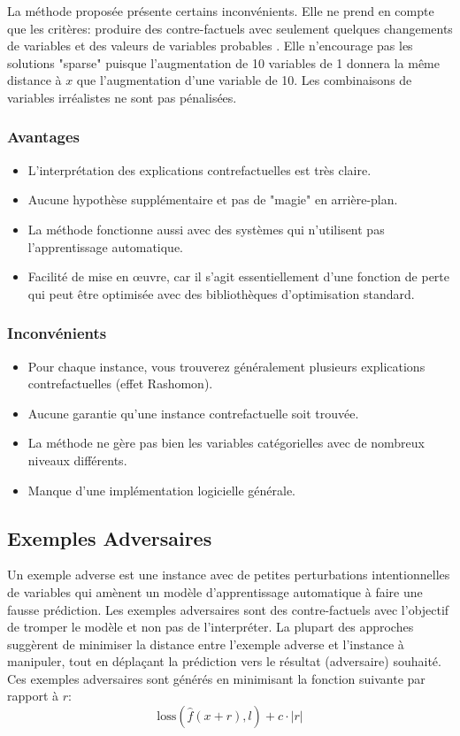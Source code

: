 La méthode proposée présente certains inconvénients. Elle ne prend en compte que les critères: produire des contre-factuels avec seulement quelques changements de variables et des valeurs de variables probables . Elle n'encourage pas les solutions "sparse" puisque l'augmentation de 10 variables de 1 donnera la même distance à \(x\) que l'augmentation d'une variable de 10. Les combinaisons de variables irréalistes ne sont pas pénalisées.


\subsubsection{Avantages}
\begin{itemize}
    \item L'interprétation des explications contrefactuelles est très claire.
    \item Aucune hypothèse supplémentaire et pas de "magie" en arrière-plan.
    \item La méthode fonctionne aussi avec des systèmes qui n'utilisent pas l'apprentissage automatique.
    \item Facilité de mise en œuvre, car il s'agit essentiellement d'une fonction de perte qui peut être optimisée avec des bibliothèques d'optimisation standard.
\end{itemize}

\subsubsection{Inconvénients}
\begin{itemize}
    \item Pour chaque instance, vous trouverez généralement plusieurs explications contrefactuelles (effet Rashomon).
    \item Aucune garantie qu'une instance contrefactuelle soit trouvée.
    \item La méthode ne gère pas bien les variables catégorielles avec de nombreux niveaux différents.
    \item Manque d'une implémentation logicielle générale.
\end{itemize}



\subsection{Exemples Adversaires}
Un exemple adverse est une instance avec de petites perturbations intentionnelles de variables qui amènent un modèle d'apprentissage automatique à faire une fausse prédiction. Les exemples adversaires sont des contre-factuels avec l'objectif de tromper le modèle et non pas de l'interpréter.
La plupart des approches suggèrent de minimiser la distance entre l'exemple adverse et l'instance à manipuler, tout en déplaçant la prédiction vers le résultat (adversaire) souhaité.
Ces exemples adversaires sont générés en minimisant la fonction suivante par rapport à \( r \):
\[
\text{loss}(\hat{f}(x+r),l)+c\cdot|r|
\]

